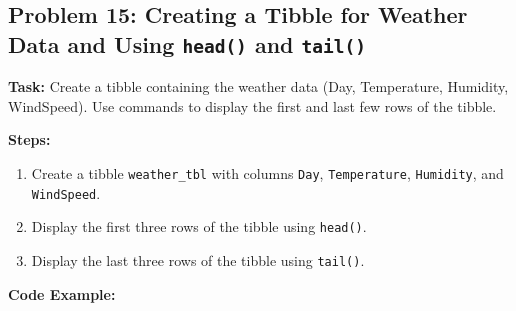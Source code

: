 \documentclass[
  letterpaper,
  DIV=11,
  numbers=noendperiod]{scrreprt}
\providecommand{\tightlist}{%
  \setlength{\itemsep}{0pt}\setlength{\parskip}{0pt}}\usepackage{longtable,booktabs,array}
\begin{document}
\subsection*{\texorpdfstring{Problem 15: Creating a Tibble for Weather
Data and Using \texttt{head()} and
\texttt{tail()}}{Problem 15: Creating a Tibble for Weather Data and Using head() and tail()}}\label{problem-15-creating-a-tibble-for-weather-data-and-using-head-and-tail}

\textbf{Task:} Create a tibble containing the weather data (Day,
Temperature, Humidity, WindSpeed). Use commands to display the first and
last few rows of the tibble.

\textbf{Steps:}

\begin{enumerate}
\def\labelenumi{\arabic{enumi}.}
\tightlist
\item
  Create a tibble \texttt{weather\_tbl} with columns \texttt{Day},
  \texttt{Temperature}, \texttt{Humidity}, and \texttt{WindSpeed}.
\item
  Display the first three rows of the tibble using \texttt{head()}.
\item
  Display the last three rows of the tibble using \texttt{tail()}.
\end{enumerate}

\textbf{Code Example:}
\end{document}
